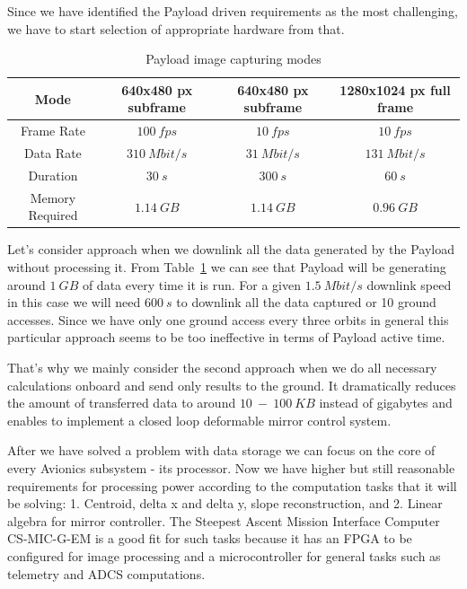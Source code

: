 \documentclass[12pt]{article}
\begin{document}
Since we have identified the Payload driven requirements as the most challenging, we have to start selection of appropriate hardware from that.

\begin{table}[ht]
\caption{Payload image capturing modes}
\label{table:avionics_modes}
\begin{center}
    \begin{tabular}{| c || c | c | c |} \hline
    	Mode & 640x480 px subframe &  640x480 px subframe & 1280x1024 px  full frame \\ \hline \hline
    Frame Rate & $100\ fps$ & $10\ fps$ & $10\ fps$ \\
    Data Rate & $310\ Mbit/s$ & $31\ Mbit/s$ & $131\ Mbit/s$ \\
    Duration & $30\ s$ & $300\ s$ & $60\ s$ \\
    Memory Required & $1.14\ GB$ & $1.14\ GB$ & $0.96\ GB$ \\ \hline 
    \end{tabular}
\end{center}
\end{table}

Let’s consider approach when we downlink all the data generated by the Payload without processing it. From Table~\ref{table:avionics_modes} we can see that Payload will be generating around $1\ GB$ of data every time it is run. For a given $1.5\ Mbit/s$ downlink speed in this case we will need $600\ s$ to downlink all the data captured or 10 ground accesses. Since we have only one ground access every three orbits in general this particular approach seems to be too ineffective in terms of Payload active time. 

That’s why we mainly consider the second approach when we do all necessary calculations onboard and send only results to the ground. It dramatically reduces the amount of transferred data to around $10\ -\ 100\ KB$ instead of gigabytes and enables to implement a closed loop deformable mirror control system.

After we have solved a problem with data storage we can focus on the core of every Avionics subsystem - its processor. Now we have higher but still reasonable requirements for processing power according to the computation tasks that it will be solving: 1. Centroid, delta x and delta y, slope reconstruction, and 2. Linear algebra for mirror controller.
The Steepest Ascent Mission Interface Computer CS-MIC-G-EM is a good fit for such tasks because it has an FPGA to be configured for image processing and a microcontroller for general tasks such as telemetry and ADCS computations.
\end{document}
